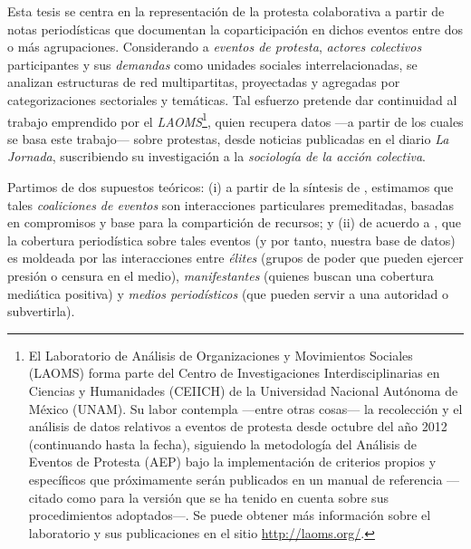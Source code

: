 \documentclass[letterpaper, 11pt]{book}
\theoremstyle{definition}
\theoremstyle{remark}
\begin{document}
Esta tesis se centra en la representación de la protesta colaborativa a partir de notas periodísticas que documentan la coparticipación en dichos eventos entre dos o más agrupaciones. 
Considerando a \emph{eventos de protesta}, \emph{actores colectivos} participantes y sus \emph{demandas} como unidades sociales interrelacionadas, se analizan estructuras de red multipartitas, proyectadas y agregadas por categorizaciones sectoriales y temáticas.
Tal esfuerzo pretende dar continuidad al trabajo emprendido por el \emph{LAOMS}\footnote{
    El Laboratorio de Análisis de Organizaciones y Movimientos Sociales (LAOMS) forma parte del Centro de Investigaciones Interdisciplinarias en Ciencias y Humanidades (CEIICH) de la Universidad Nacional Autónoma de México (UNAM). 
    Su labor contempla ---entre otras cosas--- la recolección y el análisis de datos relativos a eventos de protesta desde octubre del año 2012 (continuando hasta la fecha), siguiendo la metodología del Análisis de Eventos de Protesta (AEP) bajo la implementación de criterios propios y específicos que próximamente serán publicados en un manual de referencia ---citado como \citet{2017_Cadena_ManualLAOMS} para la versión que se ha tenido en cuenta sobre sus procedimientos adoptados---. Se puede obtener más información sobre el laboratorio y sus publicaciones en el sitio \url{http://laoms.org/}.
    }, 
quien recupera datos ---a partir de los cuales se basa este trabajo--- sobre protestas, desde noticias publicadas en el diario \emph{La Jornada}, suscribiendo su investigación a la \emph{sociología de la acción colectiva}. 


Partimos de dos supuestos teóricos: 
(i) a partir de la síntesis de \citet{2012_Wand_andSoule_ColabiracionOMS}, estimamos que tales \emph{coaliciones de eventos} son interacciones particulares premeditadas, basadas en compromisos y base para la compartición de recursos; 
y (ii) de acuerdo a \citet{2003_Wada_Tesis}, que la cobertura periodística sobre tales eventos (y por tanto, nuestra base de datos) es moldeada por las interacciones entre \emph{élites} (grupos de poder que pueden ejercer presión o censura en el medio), \emph{manifestantes} (quienes buscan una cobertura mediática positiva) y \emph{medios periodísticos} (que pueden servir a una autoridad o subvertirla). 
\end{document}
